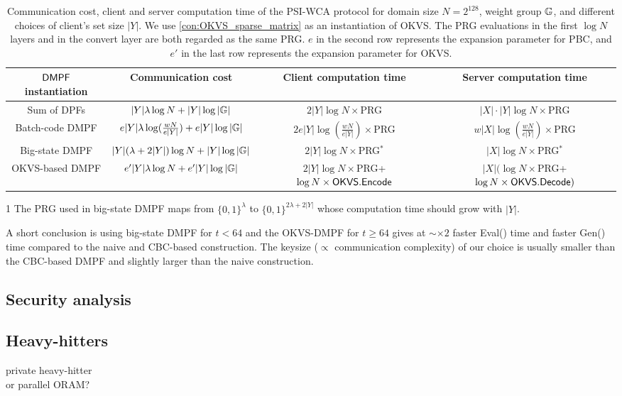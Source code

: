 \begin{table*}
  \renewcommand\arraystretch{1.5}
  \begin{threeparttable}
  \caption{Communication cost, client and server computation time of the PSI-WCA protocol for domain size $N = 2^{128}$, weight group $\mathbb{G}$, and  different choices of client's set size $|Y|$. We use \cref{con:OKVS_sparse_matrix} as an instantiation of OKVS. The PRG evaluations in the first $\log N$ layers and in the convert layer are both regarded as the same PRG. $e$ in the second row represents the expansion parameter for PBC, and $e'$ in the last row represents the expansion parameter for OKVS. }
\label{tab:PSI_plug_in_formula}
  \begin{tabular}{cccc}
          \toprule
    ${\sf DMPF}$ instantiation & Communication cost & Client computation time & Server computation time \\
          \midrule

          Sum of DPFs & $|Y|\lambda\log N+|Y|\log|\mathbb{G}|$ & $2|Y|\log N\times $PRG & $|X|\cdot |Y|\log N\times $PRG\\

          Batch-code DMPF & $e|Y|\lambda\log(\frac{wN}{e|Y|})+e|Y|\log|\mathbb{G}|$ & $2e|Y|\log(\frac{wN}{e|Y|})\times$PRG & $w|X|\log(\frac{wN}{e|Y|})\times$PRG\\

          Big-state DMPF & $|Y|(\lambda+2|Y|)\log N+|Y|\log|\mathbb{G}|$ & $2|Y|\log N\times $PRG$^*$\tnote{1} & $|X|\log N \times$PRG$^*$\\

          OKVS-based DMPF& $e'|Y|\lambda\log N +e'|Y|\log|\mathbb{G}|$ & $2|Y|\log N\times$PRG+$\log N\times {\sf OKVS}.{\sf Encode}$ & $|X|(\log N\times$PRG+$\log N\times {\sf OKVS}.{\sf Decode})$\\
          \bottomrule
  \end{tabular}
  \begin{tablenotes}
    \item [1] The PRG used in big-state DMPF maps from $\{0,1\}^\lambda$ to $\{0,1\}^{2\lambda+2|Y|}$ whose computation time should grow with $|Y|$.
  \end{tablenotes}
\end{threeparttable}
\end{table*}



A short conclusion is using big-state DMPF for $t<64$ and the OKVS-DMPF for $t\ge 64$ gives at $\sim \times 2$ faster Eval() time and faster Gen() time compared to the naive and CBC-based construction. The keysize ($\propto$ communication complexity) of our choice is usually smaller than the CBC-based DMPF and slightly larger than the naive construction. 
\subsection{Security analysis}
\subsection{Heavy-hitters}
private heavy-hitter\\
or parallel ORAM?